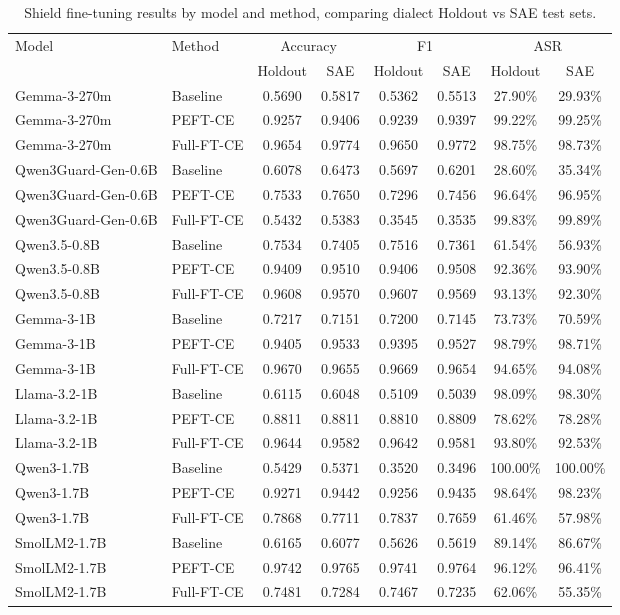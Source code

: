 \begin{table}[t]
\centering
\footnotesize
\begin{tabular}{llcccccc}
\toprule
\multirow{2}{*}{Model} & \multirow{2}{*}{Method} & \multicolumn{2}{c}{Accuracy} & \multicolumn{2}{c}{F1} & \multicolumn{2}{c}{ASR} \\
& & Holdout & SAE & Holdout & SAE & Holdout & SAE \\
\midrule
Gemma-3-270m & Baseline & 0.5690 & 0.5817 & 0.5362 & 0.5513 & 27.90\% & 29.93\% \\
Gemma-3-270m & PEFT-CE & 0.9257 & 0.9406 & 0.9239 & 0.9397 & 99.22\% & 99.25\% \\
Gemma-3-270m & Full-FT-CE & 0.9654 & 0.9774 & 0.9650 & 0.9772 & 98.75\% & 98.73\% \\
Qwen3Guard-Gen-0.6B & Baseline & 0.6078 & 0.6473 & 0.5697 & 0.6201 & 28.60\% & 35.34\% \\
Qwen3Guard-Gen-0.6B & PEFT-CE & 0.7533 & 0.7650 & 0.7296 & 0.7456 & 96.64\% & 96.95\% \\
Qwen3Guard-Gen-0.6B & Full-FT-CE & 0.5432 & 0.5383 & 0.3545 & 0.3535 & 99.83\% & 99.89\% \\
Qwen3.5-0.8B & Baseline & 0.7534 & 0.7405 & 0.7516 & 0.7361 & 61.54\% & 56.93\% \\
Qwen3.5-0.8B & PEFT-CE & 0.9409 & 0.9510 & 0.9406 & 0.9508 & 92.36\% & 93.90\% \\
Qwen3.5-0.8B & Full-FT-CE & 0.9608 & 0.9570 & 0.9607 & 0.9569 & 93.13\% & 92.30\% \\
Gemma-3-1B & Baseline & 0.7217 & 0.7151 & 0.7200 & 0.7145 & 73.73\% & 70.59\% \\
Gemma-3-1B & PEFT-CE & 0.9405 & 0.9533 & 0.9395 & 0.9527 & 98.79\% & 98.71\% \\
Gemma-3-1B & Full-FT-CE & 0.9670 & 0.9655 & 0.9669 & 0.9654 & 94.65\% & 94.08\% \\
Llama-3.2-1B & Baseline & 0.6115 & 0.6048 & 0.5109 & 0.5039 & 98.09\% & 98.30\% \\
Llama-3.2-1B & PEFT-CE & 0.8811 & 0.8811 & 0.8810 & 0.8809 & 78.62\% & 78.28\% \\
Llama-3.2-1B & Full-FT-CE & 0.9644 & 0.9582 & 0.9642 & 0.9581 & 93.80\% & 92.53\% \\
Qwen3-1.7B & Baseline & 0.5429 & 0.5371 & 0.3520 & 0.3496 & 100.00\% & 100.00\% \\
Qwen3-1.7B & PEFT-CE & 0.9271 & 0.9442 & 0.9256 & 0.9435 & 98.64\% & 98.23\% \\
Qwen3-1.7B & Full-FT-CE & 0.7868 & 0.7711 & 0.7837 & 0.7659 & 61.46\% & 57.98\% \\
SmolLM2-1.7B & Baseline & 0.6165 & 0.6077 & 0.5626 & 0.5619 & 89.14\% & 86.67\% \\
SmolLM2-1.7B & PEFT-CE & 0.9742 & 0.9765 & 0.9741 & 0.9764 & 96.12\% & 96.41\% \\
SmolLM2-1.7B & Full-FT-CE & 0.7481 & 0.7284 & 0.7467 & 0.7235 & 62.06\% & 55.35\% \\
\bottomrule
\end{tabular}
\caption{Shield fine-tuning results by model and method, comparing dialect Holdout vs SAE test sets.}
\label{tab:shield_by_dataset}
\end{table}